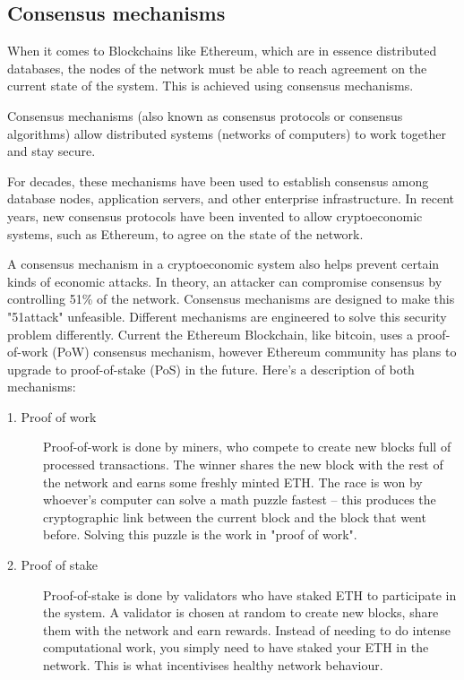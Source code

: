 \subsection{Consensus mechanisms}
When it comes to Blockchains like Ethereum, which are in essence distributed databases, the nodes of the network must be able to reach agreement on the current state of the system. This is achieved using consensus mechanisms.

Consensus mechanisms (also known as consensus protocols or consensus algorithms) allow distributed systems (networks of computers) to work together and stay secure.

For decades, these mechanisms have been used to establish consensus among database nodes, application servers, and other enterprise infrastructure. In recent years, new consensus protocols have been invented to allow \gls{cryptoeconomic} systems, such as Ethereum, to agree on the state of the network.

A consensus mechanism in a cryptoeconomic system also helps prevent certain kinds of economic attacks. In theory, an attacker can compromise consensus by controlling 51\% of the network. Consensus mechanisms are designed to make this "\gls{51attack}" unfeasible. Different mechanisms are engineered to solve this security problem differently. Current the Ethereum Blockchain, like bitcoin, uses a proof-of-work (PoW) consensus mechanism, however Ethereum community has plans to upgrade to proof-of-stake (PoS) in the future\cite{ethereumcommunityEthereumDevelopmentDocumentation}. Here's a description of both mechanisms:

\begin{description}
\item[1. Proof of work] Proof-of-work is done by miners, who compete to create new blocks full of processed transactions. The winner shares the new block with the rest of the network and earns some freshly minted \gls{ETH}. The race is won by whoever's computer can solve a math puzzle fastest – this produces the cryptographic link between the current block and the block that went before. Solving this puzzle is the work in "proof of work".
\item[2. Proof of stake] Proof-of-stake is done by validators who have staked ETH to participate in the system. A validator is chosen at random to create new blocks, share them with the network and earn rewards. Instead of needing to do intense computational work, you simply need to have staked your ETH in the network. This is what incentivises healthy network behaviour.
\end{description}

